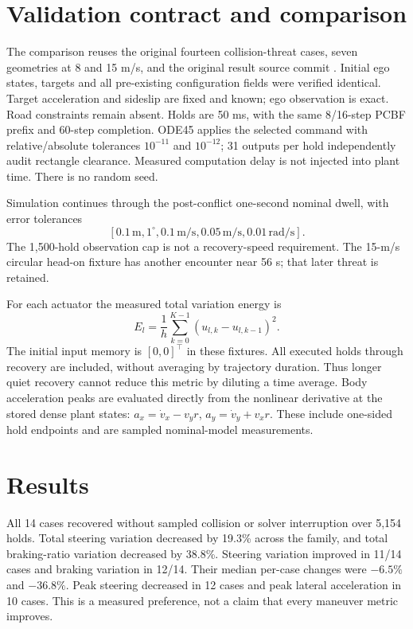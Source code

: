 \documentclass[10pt]{article}
\begin{document}
\section{Validation contract and comparison}
The comparison reuses the original fourteen collision-threat cases, seven
geometries at 8 and 15 m/s, and the original result source commit
. Initial ego states, targets and
all pre-existing configuration fields were verified identical. Target
acceleration and sideslip are fixed and known; ego observation is exact.
Road constraints remain absent. Holds are 50 ms, with the same 8/16-step
PCBF prefix and 60-step completion. ODE45 applies the selected command with
relative/absolute tolerances $10^{-11}$ and $10^{-12}$; 31 outputs per hold
independently audit rectangle clearance. Measured computation delay is not
injected into plant time. There is no random seed.

Simulation continues through the post-conflict one-second nominal dwell, with
error tolerances
\[ [0.1\,\mathrm m,1^\circ,0.1\,\mathrm{m/s},
0.05\,\mathrm{m/s},0.01\,\mathrm{rad/s}]. \]
The 1,500-hold observation cap is
not a recovery-speed requirement. The 15-m/s circular head-on fixture has
another encounter near 56 s; that later threat is retained.

For each actuator the measured total variation energy is
\[
 E_l=\frac{1}{h}\sum_{k=0}^{K-1}(u_{l,k}-u_{l,k-1})^2.
\]
The initial input memory is $[0,0]^\top$ in these fixtures. All executed holds
through recovery are included, without averaging by trajectory duration. Thus
longer quiet recovery cannot reduce this metric by diluting a time average.
Body acceleration peaks are evaluated directly from the nonlinear derivative
at the stored dense plant states:
$a_x=\dot v_x-v_y r$, $a_y=\dot v_y+v_x r$. These include one-sided hold
endpoints and are sampled nominal-model measurements.

\section{Results}
All 14 cases recovered without sampled collision or solver interruption over
5,154 holds. Total steering variation decreased by 19.3\% across the family,
and total braking-ratio variation decreased by 38.8\%. Steering variation
improved in 11/14 cases and braking variation in 12/14. Their median per-case
changes were $-6.5\%$ and $-36.8\%$. Peak steering decreased in 12 cases and
peak lateral acceleration in 10 cases. This is a measured preference, not a
claim that every maneuver metric improves.
\end{document}
